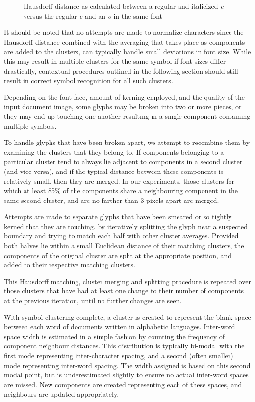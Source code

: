 \documentclass[times, 10pt,twocolumn]{article}
\begin{document}
\begin{figure}[ht]
  \centering
  \caption{Hausdorff distance as calculated between a regular and italicized
  {\em e} versus the regular {\em e} and an {\em o} in the same font}
  \label{hausdist_fig}
\end{figure}

It should be noted that no attempts are made to normalize characters since the
Hausdorff distance combined with the averaging that takes place as components
are added to the clusters, can typically handle small deviations in font size.
While this may result in multiple clusters for the same symbol if font sizes
differ drastically, contextual procedures outlined in the following section
should still result in correct symbol recognition for all such clusters.

Depending on the font face, amount of kerning employed, and the quality of the
input document image, some glyphs may be broken into two or more pieces, or
they may end up touching one another resulting in a single component containing
multiple symbols.

To handle glyphs that have been broken apart, we attempt to recombine them by
examining the clusters that they belong to.  If components belonging to a
particular cluster tend to always lie adjacent to components in a second
cluster (and vice versa), and if the typical distance between these components
is relatively small, then they are merged.  In our experiments, those clusters
for which at least 85\% of the components share a neighbouring component in the
same second cluster, and are no farther than 3 pixels apart are merged.

Attempts are made to separate glyphs that have been smeared or so tightly
kerned that they are touching, by iteratively splitting the glyph near a
suspected boundary and trying to match each half with other cluster averages.
Provided both halves lie within a small Euclidean distance of their matching
clusters, the components of the original cluster are split at the appropriate
position, and added to their respective matching clusters.

This Hausdorff matching, cluster merging and splitting procedure is repeated
over those clusters that have had at least one change to their number of 
components at the previous iteration, until no further changes are seen.

With symbol clustering complete, a cluster is created to represent the blank
space between each word of documents written in alphabetic languages.
Inter-word space width is estimated in a simple fashion by counting the
frequency of component neighbour distances.  This distribution is typically
bi-modal with the first mode representing inter-character spacing, and a second
(often smaller) mode representing inter-word spacing.  The width assigned
is based on this second modal point, but is underestimated slightly to ensure no
actual inter-word spaces are missed.  New components are created representing
each of these spaces, and neighbours are updated appropriately.
\end{document}
